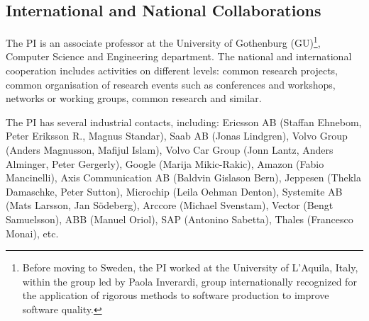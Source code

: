 \documentclass[12pt]{article}
\begin{document}
 

 



\vspace{-.4cm}

\subsection{International and National Collaborations }\label{sec:collaboration}
\vspace{-.3cm}
The PI is an associate professor at the University of Gothenburg (GU)\footnote{Before moving to Sweden, the PI worked at the University of L'Aquila, Italy, within the group led by Paola Inverardi, group internationally recognized for the application of rigorous methods to software production to improve software quality.}, Computer Science and Engineering department. 
The national and international cooperation includes activities on different levels: common research projects, common organisation of research events such as conferences and workshops, networks or working groups, common research and similar. 

The PI has several industrial contacts, including: Ericsson AB (Staffan Ehnebom, Peter Eriksson R., Magnus Standar), Saab AB (Jonas Lindgren), Volvo Group (Anders Magnusson, Mafijul Islam), Volvo Car Group (Jonn Lantz, Anders Alminger, Peter Gergerly), Google (Marija Mikic-Rakic), Amazon (Fabio Mancinelli), Axis Communication AB (Baldvin Gislason Bern), Jeppesen (Thekla Damaschke, Peter Sutton), Microchip (Leila Oehman Denton), Systemite AB (Mats Larsson, Jan S\"odeberg), Arccore (Michael Svenstam), Vector (Bengt Samuelsson), ABB (Manuel Oriol), SAP (Antonino Sabetta), Thales (Francesco Monai), etc. 
\end{document}
